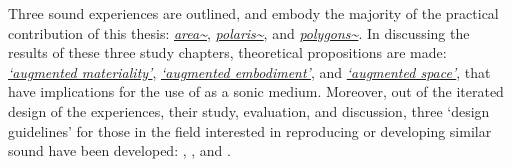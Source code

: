 \begin{SingleSpace}
    Three sound  experiences are outlined, and embody the majority of the practical contribution of this thesis: \textit{\hyperref[sec: area]{area\textasciitilde{}}}, \textit{\hyperref[sec: polaris]{polaris\textasciitilde{}}}, and \textit{\hyperref[sec: polygons]{polygons\textasciitilde{}}}. In discussing the results of these three study chapters, theoretical propositions are made: \textit{\hyperref[sec: discussion-medium-material]{`augmented materiality'}}, \textit{\hyperref[sec: discussion-medium-embodiment]{`augmented embodiment'}}, and \textit{\hyperref[sec: discussion-medium-space]{`augmented space'}}, that have implications for the use of  as a sonic medium. Moreover, out of the iterated design of the  experiences, their study, evaluation, and discussion, three `design guidelines' for those in the field interested in reproducing or developing similar sound  have been developed: \textit{\hyperref[sec: discussion-guidelines-experience]{}}, \textit{\hyperref[sec: discussion-guidelines-instrument]{}}, and \textit{\hyperref[sec: discussion-guidelines-environment]{}}.   
\end{SingleSpace}